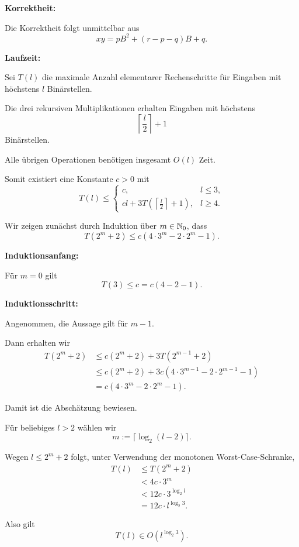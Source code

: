 
\begin{myproof}
  \textbf{Korrektheit:}

  Die Korrektheit folgt unmittelbar aus
  \[
    xy=pB^2+(r-p-q)B+q.
  \]

  \medskip
  \textbf{Laufzeit:}

  Sei $T(l)$ die maximale Anzahl elementarer
  Rechenschritte für Eingaben mit höchstens
  $l$ Binärstellen.

  Die drei rekursiven Multiplikationen
  erhalten Eingaben mit höchstens
  \[
    \left\lceil\frac l2\right\rceil+1
  \]
  Binärstellen.

  Alle übrigen Operationen benötigen
  insgesamt $O(l)$ Zeit.

  Somit existiert eine Konstante $c>0$ mit
  \[
    T(l)\le
    \begin{cases}
      c,&l\le3,\\[2mm]
      cl+3T\left(
        \left\lceil\frac l2\right\rceil+1
      \right),&l\ge4.
    \end{cases}
  \]

  Wir zeigen zunächst durch Induktion über
  $m\in\mathbb{N}_0$, dass
  \[
    T(2^m+2)
    \le c(4\cdot3^m-2\cdot2^m-1).
  \]

  \textbf{Induktionsanfang:}

  Für $m=0$ gilt
  \[
    T(3)\le c
    =c(4-2-1).
  \]

  \textbf{Induktionsschritt:}

  Angenommen, die Aussage gilt für $m-1$.

  Dann erhalten wir
  \begin{align*}
    T(2^m+2)
    &\le c(2^m+2)
      +3T(2^{m-1}+2)\\
    &\le c(2^m+2)
      +3c(4\cdot3^{m-1}
      -2\cdot2^{m-1}-1)\\
    &=c(4\cdot3^m-2\cdot2^m-1).
  \end{align*}

  Damit ist die Abschätzung bewiesen.

  Für beliebiges $l>2$ wählen wir
  \[
    m:=\lceil\log_2(l-2)\rceil.
  \]

  Wegen $l\le2^m+2$ folgt, unter Verwendung
  der monotonen Worst-Case-Schranke,
  \begin{align*}
    T(l)
    &\le T(2^m+2)\\
    &<4c\cdot3^m\\
    &<12c\cdot3^{\log_2 l}\\
    &=12c\cdot l^{\log_2 3}.
  \end{align*}

  Also gilt
  \[
    T(l)\in O(l^{\log_2 3}).
  \]
\end{myproof}

